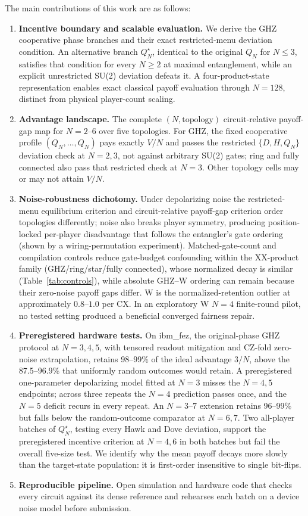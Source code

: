\documentclass[conference,letterpaper,10pt]{IEEEtran}
\begin{document}
The main contributions of this work are as follows:
\begin{enumerate}
  \item \textbf{Incentive boundary and scalable evaluation.} We derive the
  GHZ cooperative phase branches and their exact restricted-menu deviation
  condition. An alternative branch $Q_N^\star$, identical to the original
  $Q_N$ for $N\le3$, satisfies that condition for every $N\ge2$
  at maximal entanglement, while an explicit unrestricted SU(2) deviation
  defeats it. A four-product-state representation enables exact classical
  payoff evaluation through $N=128$, distinct from physical player-count scaling.
  \item \textbf{Advantage landscape.} The complete $(N,\text{topology})$
  circuit-relative payoff-gap map for $N=2$--$6$ over five topologies. For
  GHZ, the fixed cooperative profile $(Q_N,\dots,Q_N)$ pays exactly $V/N$ and
  passes the restricted $\{D,H,Q_N\}$ deviation check at $N=2,3$, not against
  arbitrary SU(2) gates; ring and fully connected also pass that restricted
  check at $N=3$. Other topology cells may or may not attain $V/N$.
  \item \textbf{Noise-robustness dichotomy.} Under depolarizing noise the
  restricted-menu equilibrium criterion and circuit-relative payoff-gap
  criterion order topologies differently; noise also breaks player symmetry,
  producing position-locked per-player disadvantage that follows the
  entangler's gate ordering (shown by a wiring-permutation experiment).
  Matched-gate-count and compilation controls reduce gate-budget confounding
  within the XX-product family (GHZ/ring/star/fully connected), whose
  normalized decay is similar (Table~\ref{tab:controls}), while absolute GHZ--W
  ordering can remain because their zero-noise payoff gaps differ. W is the
  normalized-retention outlier at approximately $0.8$--$1.0$ per CX. In an
  exploratory W $N=4$ finite-round pilot, no tested setting produced a
  beneficial converged fairness repair.
  \item \textbf{Preregistered hardware tests.} On ibm\_fez, the original-phase
  GHZ protocol at $N=3,4,5$, with tensored readout mitigation and CZ-fold
  zero-noise extrapolation, retains 98--99\% of the ideal advantage $3/N$,
  above the 87.5--96.9\% that uniformly random outcomes would retain. A
  preregistered one-parameter depolarizing model fitted at $N=3$ misses the
  $N=4,5$ endpoints; across three repeats the $N=4$ prediction passes once,
  and the $N=5$ deficit recurs in every repeat. An $N=3$--$7$ extension
  retains 96--99\% but falls below the random-outcome comparator at $N=6,7$.
  Two all-player batches of $Q_N^\star$, testing every Hawk and Dove
  deviation, support the preregistered incentive criterion at $N=4,6$ in both
  batches but fail the overall five-size test. We identify why the mean
  payoff decays more slowly than the target-state population: it is
  first-order insensitive to single bit-flips.
  \item \textbf{Reproducible pipeline.} Open simulation and hardware code
  that checks every circuit against its dense reference and rehearses each
  batch on a device noise model before submission.
\end{enumerate}
\end{document}
